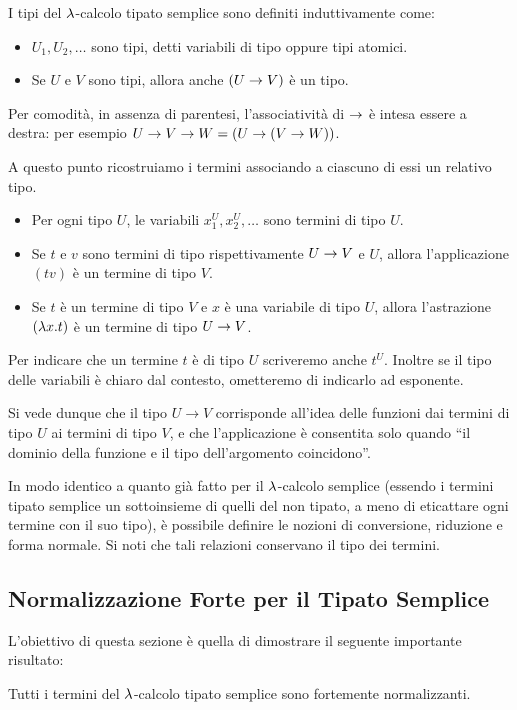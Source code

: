 \documentclass[]{marticle}
\begin{document}
\begin{block}[Definizione]
    I tipi del $\lambda$-calcolo tipato semplice sono definiti induttivamente come:
    \begin{itemize}
        \item $U_1, U_2, \dots$ sono tipi, detti variabili di tipo oppure tipi
            atomici.
        \item Se $U$ e $V$ sono tipi, allora anche $(U\rightarrow V)$ \`e un tipo.
    \end{itemize}
    Per comodit\`a, in assenza di parentesi, l'associativit\`a di $\rightarrow$ \`e
    intesa essere a destra: per esempio $U\rightarrow V\rightarrow W = (U\rightarrow(V\rightarrow W))$.

    A questo punto ricostruiamo i termini associando a ciascuno di essi un
    relativo tipo.
    \begin{itemize}
        \item Per ogni tipo $U$, le variabili $x^U_1, x^U_2, \dots$ sono termini
            di tipo $U$.
        \item Se $t$ e $v$ sono termini di tipo rispettivamente $U\rightarrow V$ e $U$,
            allora l'applicazione $(tv)$ \`e un termine di tipo $V$.
        \item Se $t$ \`e un termine di tipo $V$ e $x$ \`e una variabile di tipo
            $U$, allora l'astrazione $(\lambda x.  t)$ \`e un termine di tipo $U\rightarrow
            V$.
    \end{itemize}

    Per indicare che un termine $t$ \`e di tipo $U$ scriveremo anche $t^U$.
    Inoltre se il tipo delle variabili \`e chiaro dal contesto, ometteremo di
    indicarlo ad esponente.
\end{block}

Si vede dunque che il tipo $U\rightarrow V$ corrisponde all'idea delle funzioni
dai termini di tipo $U$ ai termini di tipo $V$, e che l'applicazione \`e
consentita solo quando ``il dominio della funzione e il tipo dell'argomento
coincidono''.

In modo identico a quanto gi\`a fatto per il $\lambda$-calcolo semplice (essendo i
termini tipato semplice un sottoinsieme di quelli del non tipato, a meno di
eticattare ogni termine con il suo tipo), \`e possibile definire le nozioni di
conversione, riduzione e forma normale. Si noti che tali relazioni conservano il
tipo dei termini.

\subsection{Normalizzazione Forte per il Tipato Semplice}
L'obiettivo di questa sezione \`e quella di dimostrare il seguente importante
risultato:
\begin{block}[Teorema]
    Tutti i termini del $\lambda$-calcolo tipato semplice sono fortemente
    normalizzanti.
\end{block}
\end{document}
